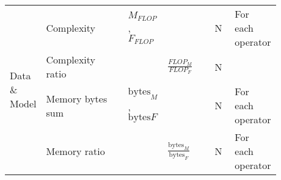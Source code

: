 \begin{tabular}{lp{0.35\linewidth}p{0.10\linewidth}>{\footnotesize}p{0.2\linewidth}p{0.08\linewidth}p{0.15\linewidth}}
    \multirow[t]{4}{*}{Data \& Model}      & Complexity                              & $M_{FLOP}$, $F_{FLOP}$            &                                         & N    & For each operator                    \\
                                           & Complexity ratio                        &                                   & $\frac{FLOP_M}{FLOP_F}$                 & N    &                                      \\
                                           & Memory bytes sum                        & $\text{bytes}_M$, $\text{bytes}F$ &                                         & N    & For each operator                    \\
                                           & Memory ratio                            &                                   & $\frac{\text{bytes}_M}{\text{bytes}_F}$ & N    & For each operator                    \\


\end{tabular}
